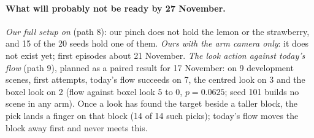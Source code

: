 \paragraph{What will probably not be ready by 27 November.}
\emph{Our full setup on \cuncert} (path 8): our pinch does not hold the lemon or the strawberry, and 15 of the
20 seeds hold one of them.
\emph{Ours with the arm camera only}: it does not exist yet; first episodes about 21 November.
\emph{The look action against today's flow} (path 9), planned as a paired result for 17 November: on 9
development scenes, first attempts, today's flow succeeds on 7, the centred look on 3 and the boxel look on 2
(flow against boxel look 5 to 0, $p = 0.0625$; seed 101 builds no scene in any arm). Once a look has found the
target beside a taller block, the pick lands a finger on that block (14 of 14 such picks); today's flow moves the block away
first and never meets this.

